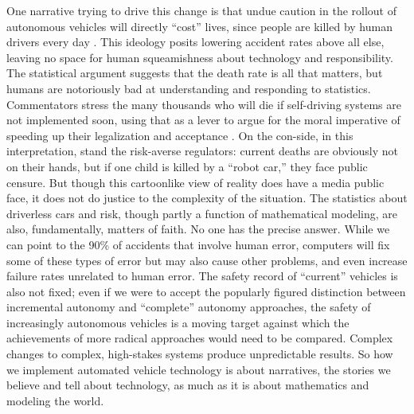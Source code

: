 One narrative trying to drive this change is that undue caution in the
rollout of autonomous vehicles will directly ``cost'' lives, since
people are killed by human drivers every day \cite{driverlessfuture}.
This ideology posits lowering accident rates above all else, leaving
no space for human squeamishness about technology and responsibility. 
The statistical argument suggests that the death rate is all that
matters, but humans are notoriously bad at understanding and
responding to statistics. Commentators stress the many
thousands who will die if self-driving systems are not implemented
soon, using that as a lever to argue for the moral imperative of
speeding up their legalization and acceptance \cite{baileyReason}
\cite{howardRobots}. On the con-side, in 
this interpretation, stand the risk-averse regulators: current deaths
are obviously not on their hands, but if one child is killed by a
``robot car,'' they face public censure. But though this cartoonlike
view of reality does have a media public face, it does not do justice
to the complexity of the situation. The statistics about driverless
cars and risk, though partly a function of mathematical modeling, are
also, fundamentally, matters of faith. No one has the precise answer.
While we can point to the 90\% of accidents that involve human error,
computers will fix some of these types of error but may also cause
other problems, and even increase failure rates unrelated to human error.
The safety record of ``current'' vehicles is also not fixed; even if
we were to accept the popularly figured distinction between
incremental autonomy and ``complete'' autonomy approaches, the safety
of increasingly autonomous vehicles is a moving target against which
the achievements of more radical approaches would need to be compared.
Complex changes to complex, high-stakes systems produce unpredictable
results. So how we implement automated vehicle technology is
about narratives, the stories we believe and tell about technology, as
much as it is about mathematics and modeling the world. 


